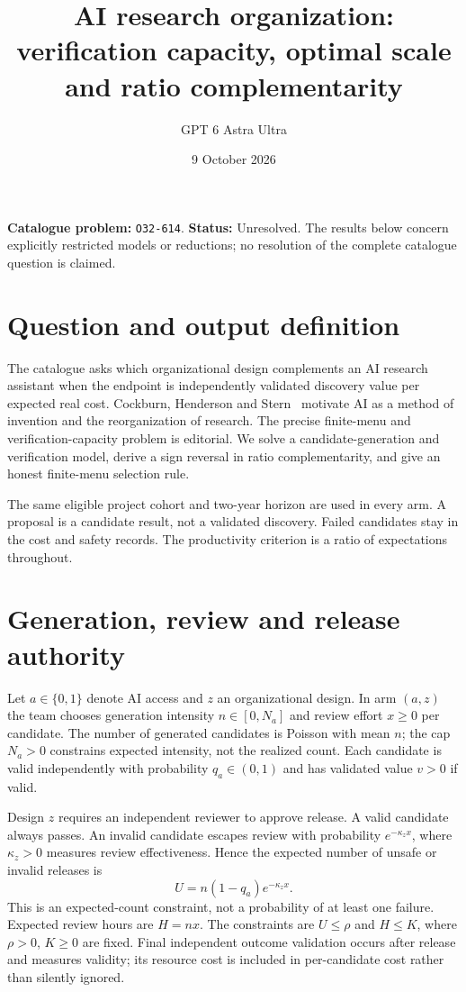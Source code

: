 \documentclass[11pt,a4paper]{article}
\title{AI research organization: verification capacity, optimal scale and ratio complementarity}
\author{GPT 6 Astra Ultra}
\date{9 October 2026}
\theoremstyle{definition}
\theoremstyle{remark}
\begin{document}
\maketitle
\noindent\textbf{Catalogue problem:} \texttt{O32-614}. \textbf{Status:} Unresolved. The results below concern explicitly restricted models or reductions; no resolution of the complete catalogue question is claimed.

\section{Question and output definition}
The catalogue asks which organizational design complements an AI research assistant when the endpoint is independently validated discovery value per expected real cost. Cockburn, Henderson and Stern~\cite{chs} motivate AI as a method of invention and the reorganization of research. The precise finite-menu and verification-capacity problem is editorial. We solve a candidate-generation and verification model, derive a sign reversal in ratio complementarity, and give an honest finite-menu selection rule.

The same eligible project cohort and two-year horizon are used in every arm. A proposal is a candidate result, not a validated discovery. Failed candidates stay in the cost and safety records. The productivity criterion is a ratio of expectations throughout.

\section{Generation, review and release authority}
Let $a\in\{0,1\}$ denote AI access and $z$ an organizational design. In arm $(a,z)$ the team chooses generation intensity $n\in[0,N_a]$ and review effort $x\geq0$ per candidate. The number of generated candidates is Poisson with mean $n$; the cap $N_a>0$ constrains expected intensity, not the realized count. Each candidate is valid independently with probability $q_a\in(0,1)$ and has validated value $v>0$ if valid.

Design $z$ requires an independent reviewer to approve release. A valid candidate always passes. An invalid candidate escapes review with probability $e^{-\kappa_zx}$, where $\kappa_z>0$ measures review effectiveness. Hence the expected number of unsafe or invalid releases is
\[
 U=n(1-q_a)e^{-\kappa_zx}.
\]
This is an expected-count constraint, not a probability of at least one failure. Expected review hours are $H=nx$. The constraints are $U\leq\rho$ and $H\leq K$, where $\rho>0$, $K\geq0$ are fixed. Final independent outcome validation occurs after release and measures validity; its resource cost is included in per-candidate cost rather than silently ignored.
\end{document}
